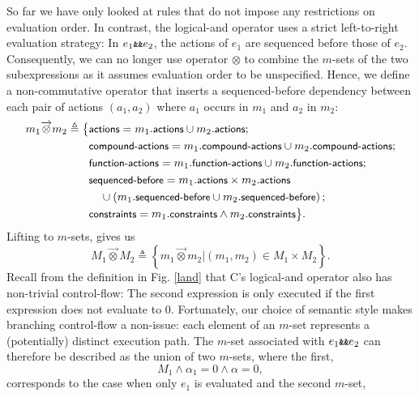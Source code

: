 \documentclass[a4paper,12pt]{scrbook}
\theoremstyle{plain}
\theoremstyle{definition}
\newcommand{\sem}[1]{{\small{\textsf{#1}}}}
\newcommand{\proj}[2]{
  #2.\sem{#1}
}
\newcommand{\sband}[0]{\overrightarrow\otimes}
\newcommand{\define}[0]{\triangleq}
\newcommand{\cc}[1]{{\text{\footnotesize\ttfamily{#1}}}}
\begin{document}
So far we have only looked at rules that do not impose any restrictions on
evaluation order. In contrast, the logical-and operator uses a strict
left-to-right evaluation strategy: In $e_1 \cc{\&\&} e_2$, the actions of $e_1$
are sequenced before those of $e_2$. Consequently, we can no longer use operator
$\otimes$ to combine the $m$-sets of the two subexpressions as it assumes
evaluation order to be unspecified. Hence, we define a non-commutative operator
that inserts a \sem{sequenced-before} dependency between each pair of actions
$\left(a_1, a_2\right)$ where $a_1$ occurs in $m_1$ and $a_2$ in $m_2$:
\begin{equation*}
  \begin{aligned}
    m_1 \sband m_2 \define \big\{
    &\sem{actions} = \proj{actions} {m_1} \cup \proj{actions} {m_2} ; \\
    &\sem{compound-actions} =
      \proj{compound-actions} {m_1} \cup \proj{compound-actions} {m_2} ; \\
    &\sem{function-actions} =
      \proj{function-actions} {m_1} \cup \proj{function-actions} {m_2} ; \\
    &\sem{sequenced-before} =
      \proj{actions}{m_1} \times \proj{actions} {m_2} \\ &\quad \cup
      \left(\proj{sequenced-before} {m_1} \cup
        \proj{sequenced-before} {m_2}\right) ; \\
    &\sem{constraints} =
      \proj{constraints} {m_1} \wedge \proj{constraints}{m_2}  \big\} .
  \end{aligned}
\end{equation*}
Lifting to $m$-sets, gives us
\begin{equation*}
M_1 \sband M_2 \define \left\{
  m_1 \sband m_2 \Big\vert \left( m_1, m_2\right) \in M_1 \times M_2
\right\} .
\end{equation*}
Recall from the definition in Fig. \ref{land} that C's logical-and operator also
has non-trivial control-flow: The second expression is only executed if the
first expression does not evaluate to $0$. Fortunately, our choice of semantic
style makes branching control-flow a non-issue: each element of an $m$-set
represents a (potentially) distinct execution path. The $m$-set associated with
$e_1 \cc{\&\&} e_2$ can therefore be described as the union of two $m$-sets,
where the first,
\begin{equation*}
M_1 \wedge \alpha_1 = 0 \wedge \alpha = 0,
\end{equation*}
corresponds to the case when only $e_1$ is evaluated and the second $m$-set,
\end{document}
